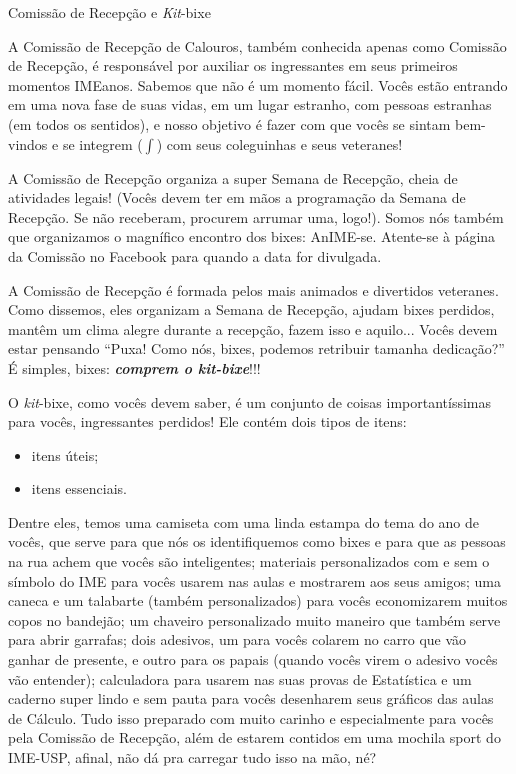\begin{secao}{Comissão de Recepção e \textit{Kit}-bixe}

A Comissão de Recepção de Calouros, também conhecida apenas como Comissão de 
Recepção, é responsável por auxiliar os ingressantes em seus primeiros momentos 
IMEanos. Sabemos que não é um momento fácil. Vocês estão entrando em uma nova fase 
de suas vidas, em um lugar estranho, com pessoas estranhas (em todos os sentidos),
e nosso objetivo é fazer com que vocês se sintam bem-vindos e se integrem
($\int$) com seus coleguinhas e seus veteranes!

A Comissão de Recepção organiza a super Semana de Recepção, cheia de atividades
legais! (Vocês devem ter em mãos a programação da Semana de Recepção. 
Se não receberam, procurem arrumar uma, logo!).
Somos nós também que organizamos o magnífico encontro dos bixes: AnIME-se. Atente-se à página da Comissão no Facebook para quando a data for divulgada. %

A Comissão de Recepção é formada pelos mais animados e divertidos veteranes. Como
dissemos, eles organizam a Semana de Recepção, ajudam bixes perdidos, mantêm um clima
alegre durante a recepção, fazem isso e aquilo...
Vocês devem estar pensando ``Puxa! Como nós, bixes, podemos retribuir
tamanha dedicação?'' É simples, bixes: {\bf\em comprem o \textit{kit}-bixe}!!!

O \textit{kit}-bixe, como vocês devem saber, é um conjunto de coisas
importantíssimas para vocês, ingressantes perdidos! Ele contém dois tipos de
itens:
\begin{itemize}
\item itens úteis;
\item itens essenciais.
\end{itemize} %
Dentre eles, temos uma camiseta com uma linda estampa do tema do ano de vocês,
que serve para que nós os identifiquemos como bixes e para que as pessoas na 
rua achem que vocês são inteligentes; materiais personalizados com e sem o símbolo do IME para 
vocês usarem nas aulas e mostrarem aos seus amigos; uma caneca e um talabarte
(também personalizados) para vocês economizarem muitos copos no bandejão; um
chaveiro personalizado muito maneiro que também serve para abrir garrafas;
dois adesivos, um para vocês colarem no carro que vão ganhar de presente, e outro
para os papais (quando vocês virem o adesivo vocês vão entender); calculadora para 
usarem nas suas provas de Estatística e um caderno super
lindo e sem pauta para vocês desenharem seus gráficos das aulas de Cálculo. Tudo
isso preparado com muito carinho e especialmente para vocês pela Comissão de Recepção,
além de estarem contidos em uma mochila sport do IME-USP, afinal, não dá pra
carregar tudo isso na mão, né?


\end{secao}
